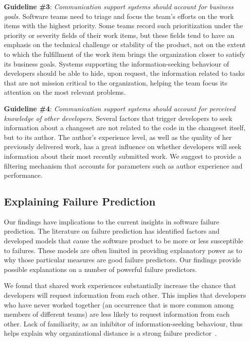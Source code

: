 \documentclass{sig-alternate}
\begin{document}
\textbf{Guideline \#3}: \emph{Communication support systems should account for business goals.}
Software teams need to triage and focus the team's efforts on the work items with the highest priority. Some teams record such prioritization under the priority or severity fields of their work items, but these fields tend to have an emphasis on the technical challenge or stability of the product, not on the extent to which the fulfillment of the work item brings the organization closer to satisfy its business goals. Systems supporting the information-seeking behaviour of developers should be able to hide, upon request, the information related to tasks that are not mission critical to the organization, helping the team focus its attention on the most relevant problems.


\textbf{Guideline \#4}: \emph{Communication support systems should account for perceived knowledge of other developers.}
Several factors that trigger developers to seek information about a changeset are not related to the code in the changeset itself, but to its author. The author's experience level, as well as the quality of her previously delivered work, has a great influence on whether developers will seek information about their most recently submitted work. We suggest to provide a filtering mechanism that accounts for parameters such as author experience and performance.


\subsection{Explaining Failure Prediction}

Our findings have implications to the current insights in software failure prediction. The literature on failure prediction has identified factors and developed models that cause the software product to be more or less susceptible to failures. These models are often limited in providing explanatory power as to why those particular measures are good failure predictors. Our findings provide possible explanations on a number of powerful failure predictors.

We found that shared work experiences substantially increase the chance that developers will request information from each other. This implies that developers who have never worked together (an occurrence that is more common among members of different teams) are less likely to request information from each other. Lack of familiarity, as an inhibitor of information-seeking behaviour, thus helps explain why organizational distance is a strong failure predictor~\cite{nagappan:icse:2008}.
\end{document}
